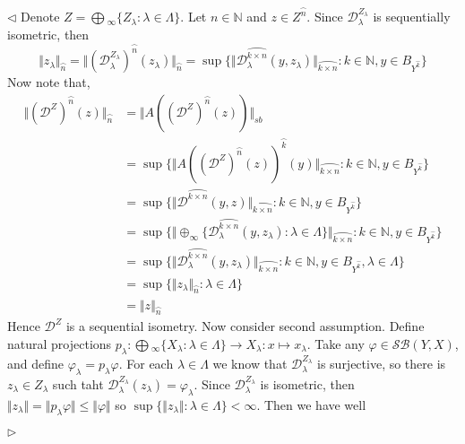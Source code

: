 \documentclass[12pt]{article}
\newenvironment{proof}{\par $\triangleleft$}{$\triangleright$}
\begin{document}
\begin{proof} Denote 
$Z=\bigoplus{}_\infty \{Z_\lambda:\lambda\in\Lambda \}$. 
Let $n\in\mathbb{N}$ and $z\in Z^{\wideparen{n}}$. Since 
$\mathcal{D}_\lambda^{Z_\lambda}$ is sequentially isometric, then
$$
\Vert z_\lambda\Vert_{\wideparen{n}}
=\Vert
    {(\mathcal{D}_\lambda^{Z_\lambda})}^{\wideparen{n}}(z_\lambda)
\Vert_{\wideparen{n}}
=\sup \{
    \Vert
        \mathcal{D}_\lambda^{\wideparen{k\times n}}(y,z_\lambda)
    \Vert_{\wideparen{k\times n}}
    :k\in\mathbb{N},y\in B_{Y^{\wideparen{k}}}
 \}
$$
Now note that,
$$
\begin{aligned}
\Vert{(\mathcal{D}^Z)}^{\wideparen{n}}(z)\Vert_{\wideparen{n}} &
=\Vert
    A({(\mathcal{D}^Z)}^{\wideparen{n}}(z))
\Vert_{sb}\\
&=\sup \{
    \Vert
        {A({(\mathcal{D}^Z)}^{\wideparen{n}}(z))}^{\wideparen{k}}(y)
    \Vert_{\wideparen{k\times n}}
    :k\in\mathbb{N},y\in B_{Y^{\wideparen{k}}}
 \} \\
&=\sup \{
    \Vert 
        \mathcal{D}^{\wideparen{k\times n}}(y,z)
    \Vert_{\wideparen{k\times n}}
    :k\in\mathbb{N},y\in B_{Y^{\wideparen{k}}}
 \} \\
&=\sup \{
    \Vert 
        \oplus_\infty
         \{
            \mathcal{D}_\lambda^{\wideparen{k\times n}}(y,z_\lambda)
            :\lambda\in\Lambda
         \}
    \Vert_{\wideparen{k\times n}}
    :k\in\mathbb{N},y\in B_{Y^{\wideparen{k}}}
 \} \\
&=\sup \{
    \Vert 
        \mathcal{D}_\lambda^{\wideparen{k\times n}}(y,z_\lambda)
    \Vert_{\wideparen{k\times n}}
    :k\in\mathbb{N},y\in B_{Y^{\wideparen{k}}},\lambda\in\Lambda
 \} \\
&=\sup \{
    \Vert z_\lambda\Vert_{\wideparen{n}}:\lambda\in\Lambda
 \} \\
&=\Vert z\Vert_{\wideparen{n}}
\end{aligned}
$$
Hence $\mathcal{D}^Z$ is a sequential isometry. Now consider second assumption. 
Define natural projections 
$p_\lambda
:\bigoplus{}_\infty \{X_\lambda:\lambda\in\Lambda \}
    \to 
X_\lambda:x\mapsto x_\lambda$. Take any $\varphi\in\mathcal{SB}(Y,X)$, and 
define $\varphi_\lambda=p_\lambda\varphi$. For each $\lambda\in\Lambda$ we 
know that $\mathcal{D}_\lambda^{Z_\lambda}$ is surjective, so there is 
$z_\lambda\in Z_\lambda$ such taht 
$\mathcal{D}_\lambda^{Z_\lambda}(z_\lambda)=\varphi_\lambda$. Since 
$\mathcal{D}_\lambda^{Z_\lambda}$ is isometric, then 
$\Vert z_\lambda\Vert=\Vert p_\lambda\varphi\Vert\leq\Vert \varphi\Vert$ so 
$\sup \{\Vert z_\lambda\Vert:\lambda\in\Lambda \}<\infty$. Then we have well 

\end{proof}
\end{document}
